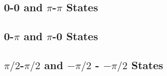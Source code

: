 \documentclass[../../../main.tex]{subfiles}
\begin{document}
\subsection{0-0 and $\pi$-$\pi$ States}


\subsection{0-$\pi$ and $\pi$-0 States}


\subsection{$\pi/2$-$\pi/2$ and $-\pi/2$ - $-\pi/2$ States}

\end{document}
